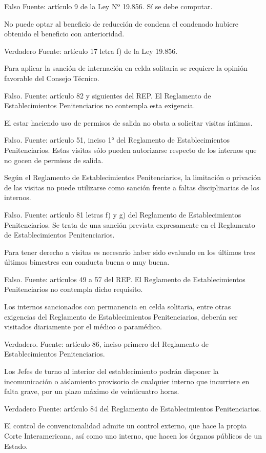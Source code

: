 \documentclass[letterpaper, 11pt]{article}
\begin{document}
Falso
Fuente: artículo 9 de la Ley Nº 19.856. Sí se debe computar.

No puede optar al beneficio de reducción de condena el condenado hubiere obtenido
el beneficio con anterioridad.

Verdadero
Fuente: artículo 17 letra f) de la Ley 19.856.

Para aplicar la sanción de internación en celda solitaria se requiere la opinión
favorable del Consejo Técnico.

Falso.
Fuente: artículo 82 y siguientes del REP. El Reglamento de Establecimientos Penitenciarios
no contempla esta exigencia.

El estar haciendo uso de permisos de salida no obsta a solicitar visitas íntimas.

Falso.
Fuente: artículo 51, inciso 1° del Reglamento de Establecimientos Penitenciarios. Estas
visitas sólo pueden autorizarse respecto de los internos que no gocen de permisos de
salida.

Según el Reglamento de Establecimientos Penitenciarios, la limitación o privación de
las visitas no puede utilizarse como sanción frente a faltas disciplinarias de los internos.

Falso.
Fuente: artículo 81 letras f) y g) del Reglamento de Establecimientos Penitenciarios. Se
trata de una sanción prevista expresamente en el Reglamento de Establecimientos
Penitenciarios.

Para tener derecho a visitas es necesario haber sido evaluado en los últimos tres últimos
bimestres con conducta buena o muy buena.

Falso.
Fuente: artículos 49 a 57 del REP. El Reglamento de Establecimientos Penitenciarios no
contempla dicho requisito.

Los internos sancionados con permanencia en celda solitaria, entre otras exigencias
del Reglamento de Establecimientos Penitenciarios, deberán ser visitados diariamente
por el médico o paramédico.

Verdadero.
Fuente: artículo 86, inciso primero del Reglamento de Establecimientos Penitenciarios.

Los Jefes de turno al interior del establecimiento podrán disponer la incomunicación o
aislamiento provisorio de cualquier interno que incurriere en falta grave, por un plazo
máximo de veinticuatro horas.

Verdadero
Fuente: artículo 84 del Reglamento de Establecimientos Penitenciarios.

El control de convencionalidad admite un control externo, que hace la propia Corte
Interamericana, así como uno interno, que hacen los órganos públicos de un Estado.
\end{document}

